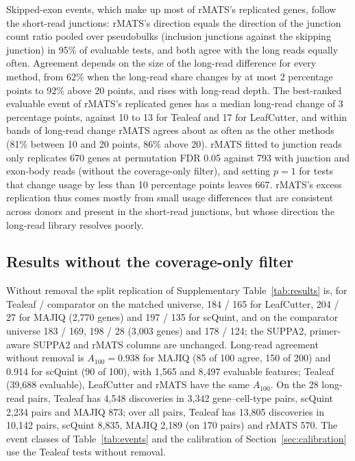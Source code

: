 \documentclass[11pt]{article}
\begin{document}
Skipped-exon events, which make up most of rMATS's replicated genes, follow the short-read junctions: rMATS's direction equals the direction of the junction count ratio pooled over pseudobulks (inclusion junctions against the skipping junction) in 95\% of evaluable tests, and both agree with the long reads equally often. Agreement depends on the size of the long-read difference for every method, from 62\% when the long-read share changes by at most 2 percentage points to 92\% above 20 points, and rises with long-read depth. The best-ranked evaluable event of rMATS's replicated genes has a median long-read change of 3 percentage points, against 10 to 13 for Tealeaf and 17 for LeafCutter, and within bands of long-read change rMATS agrees about as often as the other methods (81\% between 10 and 20 points, 86\% above 20). rMATS fitted to junction reads only replicates 670 genes at permutation FDR 0.05 against 793 with junction and exon-body reads (without the coverage-only filter), and setting $p=1$ for tests that change usage by less than 10 percentage points leaves 667. rMATS's excess replication thus comes mostly from small usage differences that are consistent across donors and present in the short-read junctions, but whose direction the long-read library resolves poorly.

\subsection{Results without the coverage-only filter}
\label{sec:unfiltered}

Without removal the split replication of Supplementary Table~\ref{tab:results} is, for Tealeaf / comparator on the matched universe, 184 / 165 for LeafCutter, 204 / 27 for MAJIQ (2{,}770 genes) and 197 / 135 for scQuint, and on the comparator universe 183 / 169, 198 / 28 (3{,}003 genes) and 178 / 124; the SUPPA2, primer-aware SUPPA2 and rMATS columns are unchanged. Long-read agreement without removal is $A_{100}=0.938$ for MAJIQ (85 of 100 agree, 150 of 200) and 0.914 for scQuint (90 of 100), with 1{,}565 and 8{,}497 evaluable features; Tealeaf (39{,}688 evaluable), LeafCutter and rMATS have the same $A_{100}$. On the 28 long-read pairs, Tealeaf has 4{,}548 discoveries in 3{,}342 gene--cell-type pairs, scQuint 2{,}234 pairs and MAJIQ 873; over all pairs, Tealeaf has 13{,}805 discoveries in 10{,}142 pairs, scQuint 8{,}835, MAJIQ 2{,}189 (on 170 pairs) and rMATS 570. The event classes of Table~\ref{tab:events} and the calibration of Section~\ref{sec:calibration} use the Tealeaf tests without removal.
\end{document}
